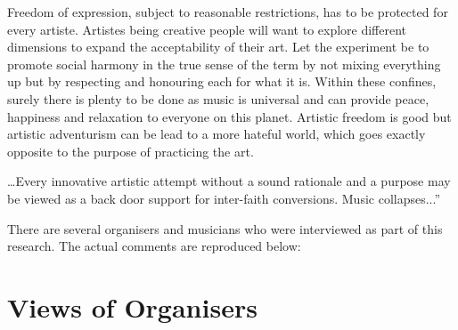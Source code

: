 \begin{myquote}
Freedom of expression, subject to reasonable restrictions, has to be protected for every artiste. Artistes being creative people will want to explore different dimensions to expand the acceptability of their art. Let the experiment be to promote social harmony in the true sense of the term by not mixing everything up but by respecting and honouring each for what it is. Within these confines, surely there is plenty to be done as music is universal and can provide peace, happiness and relaxation to everyone on this planet. Artistic freedom is good but artistic adventurism can be lead to a more hateful world, which goes exactly opposite to the purpose of practicing the art.
\end{myquote}

\begin{myquote}
…Every innovative artistic attempt without a sound rationale and a purpose may be viewed as a back door support for inter-faith conversions. Music collapses...”
\end{myquote}

There are several organisers and musicians who were interviewed as part of this research. The actual comments are reproduced below:

\vspace{-.4cm}

\section*{Views of Organisers}

